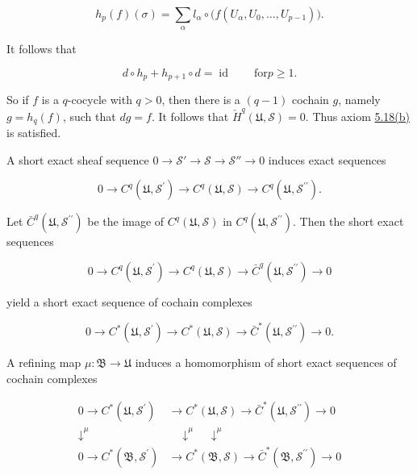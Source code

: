 \begin{equation}
\tag{14}\label{eq:5.33:14}
h_{p}(f)(\sigma)=\sum_{\alpha}l_{\alpha}\circ\big(f(U_{\alpha},U_{0},\ldots,U_{p-1})\big).
\end{equation}

It follows that

\begin{equation}
\tag{15}\label{eq:5.33:15}
d\circ h_{p}+h_{p+1}\circ d=\operatorname{id}\qquad\mathrm{for}p\geq1.
\end{equation}

So if $f$ is a $q$-cocycle with $q>0$, then there is a $(q-1)$ cochain $g$, namely $g=h_q(f)$, such that $dg=f$. It follows that $\check{H}^q(\mathfrak{U},\mathcal{S})=0$. Thus axiom \hyperref[thm:5.18]{5.18(b)} is satisfied.

A short exact sheaf sequence  $ 0 \to \mathcal{S}' \to \mathcal{S} \to \mathcal{S}'' \to 0 $ induces exact sequences

\begin{equation}
\tag{16}\label{eq:5.33:16}
0\to C^{q}(\mathfrak{U},\mathcal{S}^{\prime})\to C^{q}(\mathfrak{U},\mathcal{S})\to C^{q}(\mathfrak{U},\mathcal{S}^{\prime\prime}).
\end{equation}

Let $\bar{C}^q(\mathfrak{U},\mathcal{S}^{\prime\prime})$ be the image of $C^q(\mathfrak{U},\mathcal{S})$ in $C^q(\mathfrak{U},\mathcal{S}^{\prime\prime})$. Then the short exact sequences

\begin{equation}
\tag{17}\label{eq:5.33:17}
0\to C^{q}(\mathfrak{U},\mathcal{S}^{\prime})\to C^{q}(\mathfrak{U},\mathcal{S})\to\bar{C}^{q}(\mathfrak{U},\mathcal{S}^{\prime\prime})\to0
\end{equation}

yield a short exact sequence of cochain complexes

\begin{equation}
\tag{18}\label{eq:5.33:18}
0\to C^{*}(\mathfrak{U},\mathcal{S}^{\prime})\to C^{*}(\mathfrak{U},\mathcal{S})\to\bar{C}^{*}(\mathfrak{U},\mathcal{S}^{\prime\prime})\to0.
\end{equation}

A refining map $\mu\colon\mathfrak{B}\to\mathfrak{U}$ induces a homomorphism of short exact sequences of cochain complexes

\begin{equation}
\tag{19}\label{eq:5.33:19}
\begin{aligned}{0\to C^{*}(\mathfrak{U},\mathcal{S}^{\prime})}&{{}\to C^{*}(\mathfrak{U},\mathcal{S})\to\bar{C}^{*}(\mathfrak{U},\mathcal{S}^{\prime\prime})\to0}\\ {\downarrow^{\mu}}&{{}\quad\downarrow^{\mu}\quad\downarrow^{\mu}}\\ {0\to C^{*}(\mathfrak{B},\mathcal{S}^{\prime})}&{{}\to C^{*}(\mathfrak{B},\mathcal{S})\to\bar{C}^{*}(\mathfrak{B},\mathcal{S}^{\prime\prime})\to0}\\ \end{aligned}
\end{equation}

